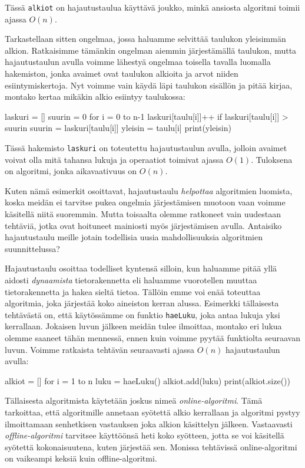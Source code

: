 Tässä \texttt{alkiot} on hajautustaulua käyttävä joukko,
minkä ansiosta algoritmi toimii ajassa $O(n)$.

Tarkastellaan sitten ongelmaa, jossa haluamme selvittää
taulukon yleisimmän alkion.
Ratkaisimme tämänkin ongelman aiemmin
järjestä\-mällä taulukon, mutta
hajautustaulun avulla voimme lähestyä ongelmaa
toisella tavalla luomalla hakemiston,
jonka avaimet ovat taulukon alkioita ja arvot niiden
esiintymiskertoja.
Nyt voimme vain käydä läpi taulukon sisällön ja
pitää kirjaa, montako kertaa mikäkin alkio esiintyy taulukossa:

\begin{code}
laskuri = []
suurin = 0
for i = 0 to n-1
    laskuri[taulu[i]]++
    if laskuri[taulu[i]] > suurin
        suurin = laskuri[taulu[i]]
        yleisin = taulu[i]
print(yleisin)
\end{code}

Tässä hakemisto \texttt{laskuri}
on toteutettu hajautustaulun avulla,
jolloin avaimet voivat olla mitä tahansa lukuja
ja operaatiot toimivat ajassa $O(1)$.
Tuloksena on algoritmi, jonka aikavaativuus on $O(n)$.

Kuten nämä esimerkit osoittavat, hajautustaulu
\emph{helpottaa} algoritmien luomista,
koska meidän ei tarvitse pukea ongelmia järjestämisen muotoon
vaan voimme käsitellä niitä suoremmin.
Mutta toisaalta olemme ratkoneet vain uudestaan tehtäviä,
jotka ovat hoituneet mainiosti myös järjestämisen avulla.
Antaisiko hajautustaulu meille jotain todellisia uusia
mahdollisuuksia algoritmien suunnittelussa?

Hajautustaulu osoittaa todelliset kyntensä silloin,
kun haluamme pitää yllä aidosti \emph{dynaamista}
tietorakennetta eli haluamme vuorotellen muuttaa
tietorakennetta ja hakea sieltä tietoa.
Tällöin emme voi enää toteuttaa algoritmia,
joka järjestää koko aineiston kerran alussa.
Esimerkki tällaisesta tehtävästä on,
että käytössämme on funktio \texttt{haeLuku},
joka antaa lukuja yksi kerrallaan.
Jokaisen luvun jälkeen meidän tulee ilmoittaa,
montako eri lukua olemme saaneet tähän mennessä,
ennen kuin voimme pyytää funktiolta seuraavan luvun.
Voimme ratkaista tehtävän seuraavasti ajassa $O(n)$
hajautustaulun avulla:

\begin{code}
alkiot = []
for i = 1 to n
    luku = haeLuku()
    alkiot.add(luku)
    print(alkiot.size())
\end{code}


Tällaisesta algoritmista käytetään joskus nimeä
\emph{online-algoritmi}.
Tämä tarkoittaa, että algoritmille annetaan syötettä
alkio kerrallaan ja algoritmi pystyy ilmoittamaan senhetkisen
vastauksen joka alkion käsittelyn jälkeen.
Vastaavasti \emph{offline-algoritmi} tarvitsee
käyttöönsä heti koko syötteen,
jotta se voi käsitellä syötettä kokonaisuutena,
kuten järjestää sen.
Monissa tehtävissä online-algoritmi on vaikeampi
keksiä kuin offline-algoritmi.
